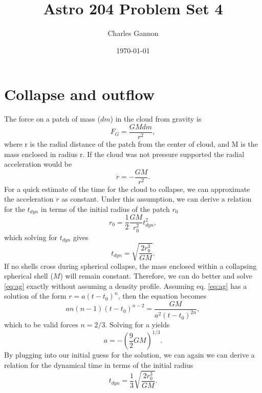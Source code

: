 \documentclass[11pt]{article}
\author{Charles Gannon}
\date{\today}
\title{Astro 204 Problem Set 4}
\begin{document}
\maketitle
\tableofcontents

\section{Collapse and outflow}
\label{sec:orga7e0318}
The force on a patch of mass (\(dm\)) in the cloud from gravity is
\begin{equation}
 F_G = \frac{G M dm}{r^{2}},
\end{equation}
where r is the radial distance of the patch from the center of cloud, and M is the mass enclosed in radius r.
If the cloud was not pressure supported the radial acceleration would be
\begin{equation}\label{eq:ag}
 \ddot{r} = -\frac{G M}{r^{2}}.
\end{equation}
For a quick estimate of the time for the cloud to collapse, we can approximate the acceleration \(\ddot{r}\)  as constant.
Under this assumption, we can derive a relation for the \(t_{dyn}\) in terms of the initial radius of the patch \(r_{0}\)
\begin{equation}
 r_{0} = \frac{1}{2} \frac{G M}{r_{0}^{2}} t_{dyn}^{2},
\end{equation}
which solving for \(t_{dyn}\) gives
\begin{equation}
 t_{dyn} = \sqrt{\frac{2 r_{0}^{3}}{GM}}.
\end{equation}
If no shells cross during spherical collapse, the mass enclosed within a collapsing spherical shell (\(M\)) will remain constant.
Therefore, we can do better and solve \ref{eq:ag} exactly without assuming a density profile.
Assuming eq. \ref{eq:ag} has a solution of the form \(r = a (t - t_{0})^{n}\), then the equation becomes
\begin{equation}
 a n (n - 1) (t - t_{0})^{n-2} = \frac{GM}{a^{2} (t - t_{0})^{2n}},
\end{equation}
which to be valid forces \(n = 2/3\).
Solving for a yields
\begin{equation}
 a = -\left( \frac{9}{2} G M \right)^{1/3}.
\end{equation}
By plugging into our initial guess for the solution, we can again we can derive a relation for the dynamical time in terms of the initial radius
\begin{equation}
  t_{dyn} = \frac{1}{3}\sqrt{\frac{2 r_{0}^{3}}{G M}}.
\end{equation}
\end{document}
